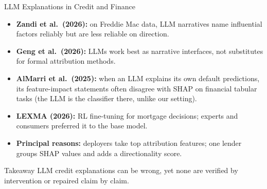 \documentclass[aspectratio=169,10pt]{beamer}
\begin{document}
\begin{frame}{LLM Explanations in Credit and Finance}
  \vspace{1ex}
  \begin{itemize}\footnotesize
    \setlength{\itemsep}{1ex}
    \item[\textbullet] {\color{vrblue}\bfseries Zandi et al.\ (2026):} on Freddie Mac data, LLM narratives name influential factors reliably but are less reliable on direction.
    \item[\textbullet] {\color{vrblue}\bfseries Geng et al.\ (2026):} LLMs work best as narrative interfaces, not substitutes for formal attribution methods.
    \item[\textbullet] {\color{vrblue}\bfseries AlMarri et al.\ (2025):} when an LLM explains its own default predictions, its feature-impact statements often disagree with SHAP on financial tabular tasks (the LLM is the classifier there, unlike our setting).
    \item[\textbullet] {\color{vrblue}\bfseries LEXMA (2026):} RL fine-tuning for mortgage decisions; experts and consumers preferred it to the base model.
    \item[\textbullet] {\color{vrblue}\bfseries Principal reasons:} deployers take top attribution features; one lender groups SHAP values and adds a directionality score.
  \end{itemize}
  \vfill
  \begin{block}{Takeaway}
    LLM credit explanations can be wrong, yet none are verified by intervention or repaired claim by claim.
  \end{block}
  \vspace{4ex}
\end{frame}
\end{document}
